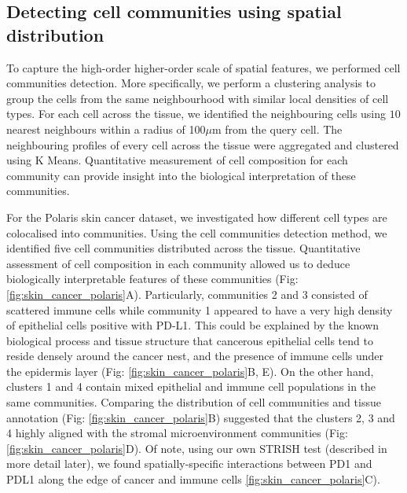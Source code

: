 \subsection{Detecting cell communities using spatial distribution}
\label{Sec:3_cell_communities_and_coocurrence}	%
To capture the high-order higher-order scale of spatial features, we performed cell communities detection. More specifically, we perform a clustering analysis to group the cells from the same neighbourhood with similar local densities of cell types. For each cell across the tissue, we identified the neighbouring cells using $10$ nearest neighbours within a radius of 100$\mu$m from the query cell. The neighbouring profiles of every cell across the tissue were aggregated and clustered using K Means. Quantitative measurement of cell composition for each community can provide insight into the biological interpretation of these communities.  

For the Polaris skin cancer dataset, we investigated how different cell types are colocalised into communities. Using the cell communities detection method, we identified five cell communities distributed across the tissue. Quantitative assessment of cell composition in each community allowed us to deduce biologically interpretable features of these communities (Fig: \ref{fig:skin_cancer_polaris}A). Particularly, communities 2 and 3 consisted of scattered immune cells while community 1 appeared to have a very high density of epithelial cells positive with PD-L1. This could be explained by the known biological process and tissue structure that cancerous epithelial cells tend to reside densely around the cancer nest, and the presence of immune cells under the epidermis layer (Fig: \ref{fig:skin_cancer_polaris}B, E). On the other hand, clusters 1 and 4 contain mixed epithelial and immune cell populations in the same communities. Comparing the distribution of cell communities and tissue annotation (Fig: \ref{fig:skin_cancer_polaris}B) suggested that the clusters 2, 3 and 4 highly aligned with the stromal microenvironment communities (Fig: \ref{fig:skin_cancer_polaris}D).  Of note, using our own STRISH test (described in more detail later), we found spatially-specific interactions between PD1 and PDL1 along the edge of cancer and immune cells \ref{fig:skin_cancer_polaris}C). 


